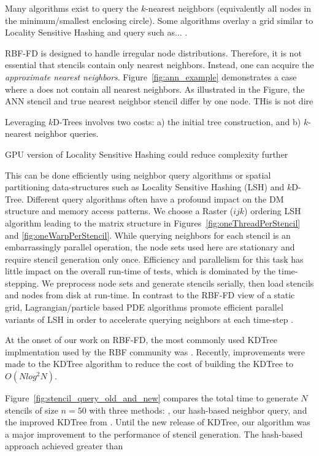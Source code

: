 \documentclass[11pt]{report}
\begin{document}
{

Many algorithms exist to query the $k$-nearest neighbors (equivalently all nodes in the minimum/smallest enclosing circle). Some algorithms overlay a grid similar to Locality Sensitive Hashing and query such as... \cite{HarPeledMazumdar2003}.

RBF-FD is designed to handle irregular node distributions. Therefore, it is not essential that stencils contain only nearest neighbors. Instead, one can acquire the \emph{approximate nearest neighbors}. Figure~\ref{fig:ann_example} demonstrates a case where a does not contain all nearest neighbors. As illustrated in the Figure, the ANN stencil and true nearest neighbor stencil differ by one node. THis is not dire



Leveraging $k$D-Trees involves two costs: a) the initial tree construction, and b) $k$-nearest neighbor queries. 

GPU version of Locality Sensitive Hashing could reduce complexity further \cite{Pan2011}

This can be done efficiently using neighbor query algorithms or spatial partitioning data-structures such as Locality Sensitive Hashing (LSH) and $k$D-Tree. Different query algorithms often have a profound impact on the DM structure and memory access patterns. We choose a Raster ($ijk$) ordering LSH algorithm \cite{Bollig2011} leading to the matrix structure in Figures~\ref{fig:oneThreadPerStencil} and \ref{fig:oneWarpPerStencil}. While querying neighbors for each stencil is an embarrassingly parallel operation, the node sets used here are stationary and require stencil generation only once. Efficiency and parallelism for this task has little impact on the overall run-time of tests, which is dominated by the time-stepping. We preprocess node sets and generate stencils serially, then load stencils and nodes from disk at run-time. In contrast to the RBF-FD view of a static grid, Lagrangian/particle based PDE algorithms promote efficient parallel variants of LSH in order to accelerate querying neighbors at each time-step \cite{Pan2011, Goswami2010}. 


At the onset of our work on RBF-FD, the most commonly used KDTree implmentation used by the RBF community was \cite{Tagliasacchi2008}. Recently, improvements were made to the KDTree algorithm to reduce the cost of building the KDTree to $O(N log^2 N)$. 

Figure~\ref{fig:stencil_query_old_and_new} compares the total time to generate $N$ stencils of size $n=50$ with three methods: \cite{Tagliasacchi2008}, our hash-based neighbor query, and the improved KDTree from \cite{Tagliasacchi2012}. 
Until the new release of KDTree, our algorithm was a major improvement to the performance of stencil generation. The hash-based approach achieved greater than 


}
\end{document}
